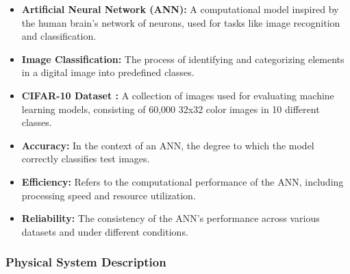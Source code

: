\documentclass[12pt]{article}
\begin{document}
\begin{itemize}
\item \textbf{Artificial Neural Network (ANN):} A computational model inspired by the human brain's 
network of neurons, used for tasks like image recognition and classification.

\item \textbf{Image Classification:} The process of identifying and categorizing elements in a 
digital image into predefined classes.

\item \textbf{CIFAR-10 Dataset \cite{CIFAR}:} A collection of images used for evaluating machine learning 
models, consisting of 60,000 32x32 color images in 10 different classes.

\item \textbf{Accuracy:} In the context of an ANN, the degree to which the model correctly 
classifies test images.

\item \textbf{Efficiency:} Refers to the computational performance of the ANN, including 
processing speed and resource utilization.

\item \textbf{Reliability:} The consistency of the ANN's performance across various datasets 
and under different conditions.
\end{itemize}

\subsubsection{Physical System Description} \label{sec_phySystDescrip}

\end{document}
